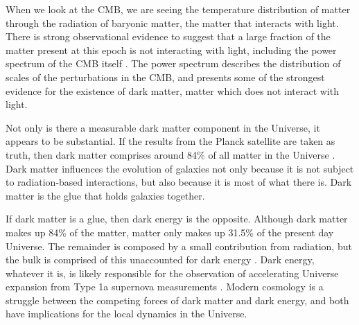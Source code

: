 When we look at the CMB, we are seeing the temperature distribution of matter through the radiation of baryonic matter, the matter that interacts with light. There is strong observational evidence to suggest that a large fraction of the matter present at this epoch is not interacting with light, including the power spectrum of the CMB itself \citep{transfer_fn}. The power spectrum describes the distribution of scales of the perturbations in the CMB, and presents some of the strongest evidence for the existence of dark matter, matter which does not interact with light.

Not only is there a measurable dark matter component in the Universe, it appears to be substantial. If the results from the Planck satellite are taken as truth, then dark matter comprises around 84\% of all matter in the Universe \citet{planck_2018}. Dark matter influences the evolution of galaxies not only because it is not subject to radiation-based interactions, but also because it is most of what there is. Dark matter is the glue that holds galaxies together.  

If dark matter is a glue, then dark energy is the opposite. Although dark matter makes up 84\% of the matter, matter only makes up 31.5\% of the present day Universe. The remainder is composed by a small contribution from radiation, but the bulk is comprised of this unaccounted for dark energy \citep{kolb_turner,dodelson}. Dark energy, whatever it is, is likely responsible for the observation of accelerating Universe expansion from Type 1a supernova measurements \citep{reiss_1998,perlmutter_1999}. Modern cosmology is a struggle between the competing forces of dark matter and dark energy, and both have implications for the local dynamics in the Universe.

